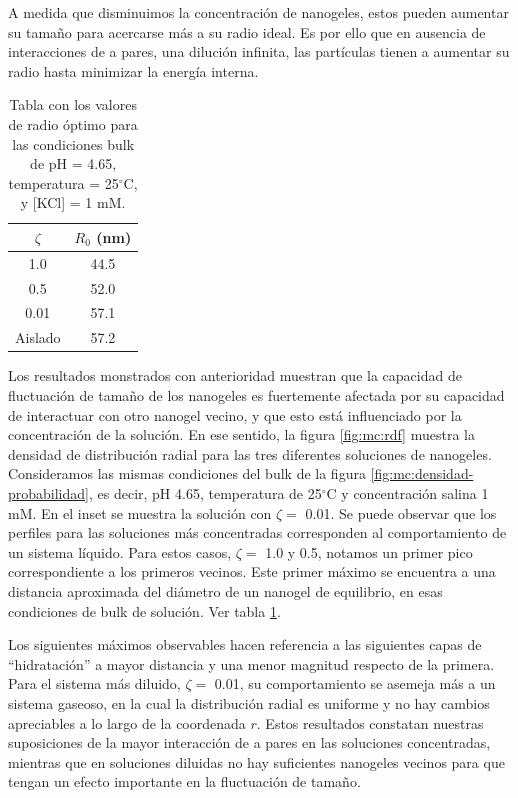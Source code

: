 	A medida que disminuimos la concentraci\'on de nanogeles, estos pueden aumentar su tama\~no para acercarse m\'as a su radio ideal. Es por ello que en ausencia de interacciones de a pares, una diluci\'on infinita, las part\'iculas tienen a aumentar su radio hasta minimizar la energ\'ia interna.
	
	
	\begin{table}[!htb]
		\centering
		\begin{tabular}{|c|c|} \hline  
			$\zeta$& $R_0$ (nm)\\ \hline  
			1.0& 44.5\\ \hline  
			0.5& 52.0\\ \hline  
			0.01& 57.1\\ \hline
			Aislado & 57.2 \\ \hline
		\end{tabular}
		\caption{Tabla con los valores de radio \'optimo para las condiciones bulk de pH = 4.65, temperatura = 25$^\circ$C, y [KCl] = 1 mM.}
		\label{tabla:mc:R-optimos}
	\end{table}
	
	Los resultados monstrados con anterioridad muestran que la capacidad de fluctuaci\'on de tama\~no de los nanogeles es fuertemente afectada por su capacidad de interactuar con otro nanogel vecino, y que esto est\'a influenciado por la concentraci\'on de la soluci\'on.
	En ese sentido, la figura \ref{fig:mc:rdf} muestra la densidad de distribuci\'on radial para las tres diferentes soluciones de nanogeles. Consideramos las mismas condiciones del bulk de la figura \ref{fig:mc:densidad-probabilidad}, es decir, pH 4.65, temperatura de 25$^\circ$C y concentraci\'on salina 1 mM.
	En el inset se muestra la solución con $\zeta =$ 0.01.
	Se puede observar que los perfiles para las soluciones m\'as concentradas corresponden al comportamiento de un sistema l\'iquido. Para estos casos, $\zeta = $ 1.0 y 0.5, notamos un primer pico correspondiente a los primeros vecinos. Este primer m\'aximo se encuentra a una distancia aproximada del di\'ametro de un nanogel de equilibrio, en esas condiciones de bulk de soluci\'on. Ver tabla \ref{tabla:mc:R-optimos}.
	
	Los siguientes m\'aximos observables hacen referencia a las siguientes capas de ``hidrataci\'on'' a mayor distancia y una menor magnitud respecto de la primera.
	Para el sistema m\'as diluido, $\zeta =$ 0.01, su comportamiento se asemeja m\'as a un sistema gaseoso, en la cual la distribuci\'on radial es uniforme y no hay cambios apreciables a lo largo de la coordenada $r$.
	Estos resultados constatan nuestras suposiciones de la mayor interacci\'on de a pares en las soluciones concentradas, mientras que en soluciones diluidas no hay suficientes nanogeles vecinos para que tengan un efecto importante en la fluctuaci\'on de tama\~no.
	
